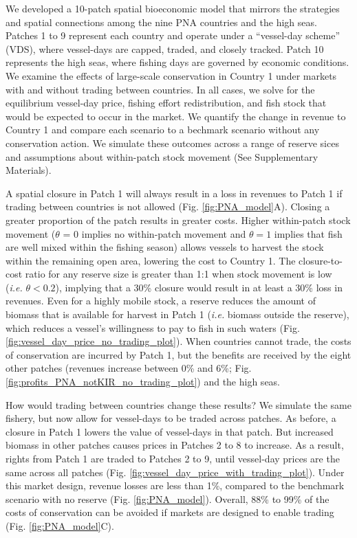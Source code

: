 \documentclass[12pt]{article}
\begin{document}
We developed a 10-patch spatial bioeconomic model that mirrors the strategies and spatial connections among the nine PNA countries and the high seas. Patches 1 to 9 represent each country and operate under a ``vessel-day scheme'' (VDS), where vessel-days are capped, traded, and closely tracked. Patch 10 represents the high seas, where fishing days are governed by economic conditions. We examine the effects of large-scale conservation in Country 1 under markets with and without trading between countries. In all cases, we solve for the equilibrium vessel-day price, fishing effort redistribution, and fish stock that would be expected to occur in the market. We quantify the change in revenue to Country 1 and compare each scenario to a bechmark scenario without any conservation action. We simulate these outcomes across a range of reserve sices and assumptions about within-patch stock movement (See Supplementary Materials).

A spatial closure in Patch 1 will always result in a loss in revenues to Patch 1 if trading between countries is not allowed (Fig. \ref{fig:PNA_model}A). Closing a greater proportion of the patch results in greater costs. Higher within-patch stock movement ($\theta$ = 0 implies no within-patch movement and $\theta = 1$ implies that fish are well mixed within the fishing season) allows vessels to harvest the stock within the remaining open area, lowering the cost to Country 1. The closure-to-cost ratio for any reserve size is greater than 1:1 when stock movement is low (\emph{i.e.} $\theta < 0.2$), implying that a 30\% closure would result in at least a 30\% loss in revenues. Even for a highly mobile stock, a reserve reduces the amount of biomass that is available for harvest in Patch 1 (\emph{i.e.} biomass outside the reserve), which reduces a vessel's willingness to pay to fish in such waters (Fig. \ref{fig:vessel_day_price_no_trading_plot}). When countries cannot trade, the costs of conservation are incurred by Patch 1, but the benefits are received by the eight other patches (revenues increase between 0\% and 6\%; Fig. \ref{fig:profits_PNA_notKIR_no_trading_plot}) and the high seas.

How would trading between countries change these results? We simulate the same fishery, but now allow for vessel-days to be traded across patches. As before, a closure in Patch 1 lowers the value of vessel-days in that patch. But increased biomass in other patches causes prices in Patches 2 to 8 to increase. As a result, rights from Patch 1 are traded to Patches 2 to 9, until vessel-day prices are the same across all patches (Fig. \ref{fig:vessel_day_price_with_trading_plot}). Under this market design, revenue losses are less than 1\%, compared to the benchmark scenario with no reserve (Fig. \ref{fig:PNA_model}). Overall, 88\% to 99\% of the costs of conservation can be avoided if markets are designed to enable trading (Fig. \ref{fig:PNA_model}C).
\end{document}
